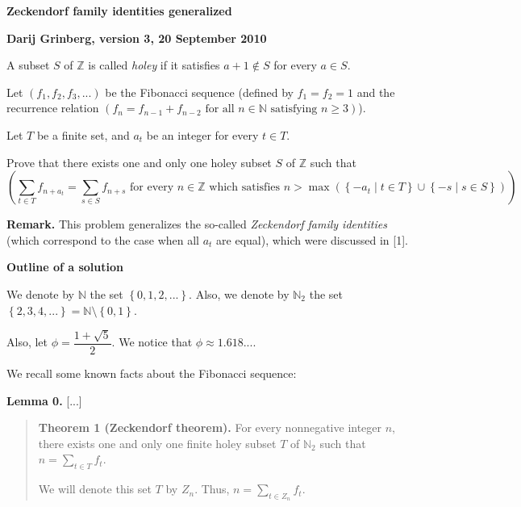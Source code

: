 \documentclass[12pt,final,notitlepage,onecolumn]{article}%
\begin{document}


\begin{center}
\textbf{Zeckendorf family identities generalized}

\textbf{Darij Grinberg, version 3, 20 September 2010}
\end{center}

A subset $S$ of $\mathbb{Z}$ is called \textit{holey} if it satisfies
$a+1\notin S$ for every $a\in S$.

Let $\left(  f_{1},f_{2},f_{3},...\right)  $ be the Fibonacci sequence
(defined by $f_{1}=f_{2}=1$ and the recurrence relation $\left(  f_{n}%
=f_{n-1}+f_{n-2}\text{ for all }n\in\mathbb{N}\text{ satisfying }%
n\geq3\right)  $).

Let $T$ be a finite set, and $a_{t}$ be an integer for every $t\in T$.

Prove that there exists one and only one holey subset $S$ of $\mathbb{Z}$ such
that
\[
\left(  \sum\limits_{t\in T}f_{n+a_{t}}=\sum\limits_{s\in S}f_{n+s}\text{ for
every }n\in\mathbb{Z}\text{ which satisfies }n>\max\left(  \left\{  -a_{t}\mid
t\in T\right\}  \cup\left\{  -s\mid s\in S\right\}  \right)  \right)  .
\]


\bigskip

\textbf{Remark.} This problem generalizes the so-called \textit{Zeckendorf
family identities} (which correspond to the case when all $a_{t}$ are equal),
which were discussed in [1].

\begin{center}
\textbf{Outline of a solution}
\end{center}

We denote by $\mathbb{N}$ the set $\left\{  0,1,2,...\right\}  $. Also, we
denote by $\mathbb{N}_{2}$ the set $\left\{  2,3,4,...\right\}  =\mathbb{N}%
\setminus\left\{  0,1\right\}  $.

Also, let $\phi=\dfrac{1+\sqrt{5}}{2}$. We notice that $\phi\approx1.618...$.

We recall some known facts about the Fibonacci sequence:

\textbf{Lemma 0.} [...]

\begin{quote}
\textbf{Theorem 1 (Zeckendorf theorem).} For every nonnegative integer $n$,
there exists one and only one finite holey subset $T$ of $\mathbb{N}_{2}$ such
that $n=\sum\limits_{t\in T}f_{t}$.

We will denote this set $T$ by $Z_{n}$. Thus, $n=\sum\limits_{t\in Z_{n}}%
f_{t}$.
\end{quote}
\end{document}
